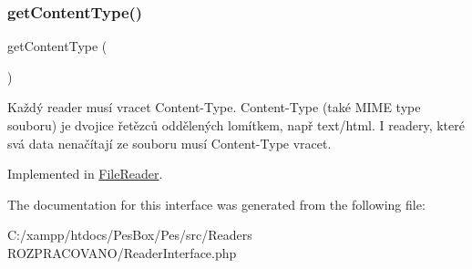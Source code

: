 \subsubsection{\texorpdfstring{get\+Content\+Type()}{getContentType()}}
{\footnotesize\ttfamily get\+Content\+Type (\begin{DoxyParamCaption}{ }\end{DoxyParamCaption})}

Každý reader musí vracet Content-\/\+Type. Content-\/\+Type (také M\+I\+ME type souboru) je dvojice řetězců oddělených lomítkem, např text/html. I readery, které svá data nenačítají ze souboru musí Content-\/\+Type vracet. 

Implemented in \mbox{\hyperlink{class_pes_1_1_readers_1_1_file_reader_aa843137beb02bc2516fe0551c00ff7d7}{File\+Reader}}.



The documentation for this interface was generated from the following file\+:\begin{DoxyCompactItemize}
\item 
C\+:/xampp/htdocs/\+Pes\+Box/\+Pes/src/\+Readers R\+O\+Z\+P\+R\+A\+C\+O\+V\+A\+N\+O/Reader\+Interface.\+php\end{DoxyCompactItemize}
